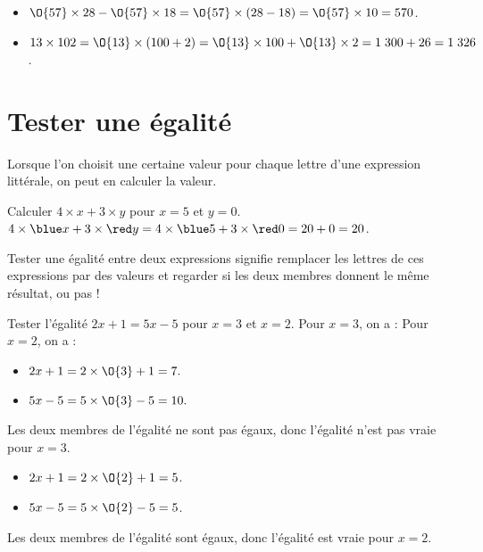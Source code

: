 \begin{exemple*1} 
   \begin{itemize}
      \item $\O{57}\times28-\O{57}\times18 =\O{57}\times(28-18) =\O{57}\times 10 =570$. 
      \item $13\times102 =\O{13}\times(100+2) =\O{13}\times100+\O{13}\times2 =1\;300+26 = 1\;326$. 
   \end{itemize}
   \vspace*{-5mm}
\end{exemple*1}
   

\section{Tester une égalité}

Lorsque l'on choisit une certaine valeur pour chaque lettre d'une expression littérale, on peut en calculer la valeur. 

\begin{exemple}[0.5]
   Calculer $4\times x+3\times y$ pour $x=5$ et $y =0$. \\
   \correction
      $4\times{\blue x}+3\times{\red y} =4\times{\blue 5}+3\times{\red 0} =20+0 =20$.
\end{exemple}

\smallskip

Tester une égalité entre deux expressions signifie remplacer les lettres de ces expressions par des valeurs et regarder si les deux membres donnent le même résultat, ou pas !   

\begin{exemple*1}
   Tester l'égalité $2x+1 =5x-5$ pour $x =3$ et $x =2$.
   \correction
      Pour $x =3$, on a : \hspace{2.5cm} Pour $x =2$, on a : \\ [-10mm]
      \begin{multicols}{2}
         \begin{itemize}
            \item $2x+1 =2\times\O{3}+1 =7.$
            \item $5x-5 =5\times\O{3}-5 =10.$
         \end{itemize}
         \vspace*{-5mm}
         Les deux membres de l'égalité ne sont pas égaux, donc l'égalité n'est pas vraie pour $x=3$. \\
         \begin{itemize}
            \item $2x+1 =2\times\O{2}+1 =5$.
            \item $5x-5 =5\times\O{2}-5 =5$.
         \end{itemize}
         Les deux membres de l'égalité sont égaux, donc l'égalité est vraie pour $x=2$.
      \end{multicols}
      \vspace*{-15mm}
\end{exemple*1}


